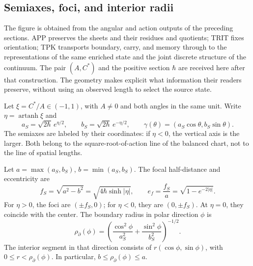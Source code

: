 
\subsection{Semiaxes, foci, and interior radii}
\label{sec:ii-elipse-geometria}

The figure is obtained from the angular and action outputs of the preceding
sections. APP preserves the sheets and their residues and quotients; TRIT fixes
orientation; TPK transports boundary, carry, and memory through to the
representations of the same enriched state and the joint discrete
structure of the continuum. The pair \((A,C^*)\) and the positive section
\(\hbar\) are received here after that construction. The geometry makes explicit
what information their readers preserve, without using an observed length
to select the source state.

Let \(\xi=C^*/A\in(-1,1)\), with \(A\ne0\) and both angles in the
same unit. Write \(\eta=\operatorname{artanh}\xi\) and
\[
 a_S=\sqrt{2\hbar}\,e^{\eta/2},\qquad
 b_S=\sqrt{2\hbar}\,e^{-\eta/2},\qquad
 \gamma(\theta)=(a_S\cos\theta,b_S\sin\theta).
\]
The semiaxes are labeled by their coordinates: if \(\eta<0\),
the vertical axis is the larger. Both belong to the square-root-of-action
line of the balanced chart, not to the line of spatial lengths.

\begin{proposition}
\label{prop:ii-elipse-focos}
Let \(a=\max(a_S,b_S)\), \(b=\min(a_S,b_S)\). The focal half-distance
and eccentricity are
\begin{equation}
 f_S=\sqrt{a^2-b^2}
 =\sqrt{4\hbar\sinh|\eta|},\qquad
 e_f=\frac{f_S}{a}=\sqrt{1-e^{-2|\eta|}}.
 \label{eq:ii-elipse-focal}
\end{equation}
For \(\eta>0\), the foci are \((\pm f_S,0)\); for
\(\eta<0\), they are \((0,\pm f_S)\). At \(\eta=0\), they coincide with
the center. The boundary radius in polar direction \(\phi\) is
\begin{equation}
 \rho_{\partial}(\phi)
 =\left(\frac{\cos^2\phi}{a_S^2}
        +\frac{\sin^2\phi}{b_S^2}\right)^{-1/2}.
 \label{eq:ii-elipse-radio-polar}
\end{equation}
The interior segment in that direction consists of
\(r(\cos\phi,\sin\phi)\), with \(0\le r<\rho_{\partial}(\phi)\).
In particular, \(b\le\rho_{\partial}(\phi)\le a\).
\end{proposition}

